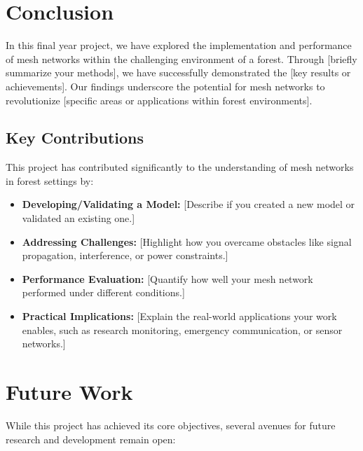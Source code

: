\section{Conclusion}
\label{ch:conclusion} %

In this final year project, we have explored the implementation and performance of mesh networks within the challenging environment of a forest. Through [briefly summarize your methods], we have successfully demonstrated the [key results or achievements]. Our findings underscore the potential for mesh networks to revolutionize [specific areas or applications within forest environments].

\subsection{Key Contributions}

This project has contributed significantly to the understanding of mesh networks in forest settings by:

\begin{itemize}
    \item \textbf{Developing/Validating a Model:} [Describe if you created a new model or validated an existing one.]
    \item \textbf{Addressing Challenges:} [Highlight how you overcame obstacles like signal propagation, interference, or power constraints.]
    \item \textbf{Performance Evaluation:} [Quantify how well your mesh network performed under different conditions.]
    \item \textbf{Practical Implications:} [Explain the real-world applications your work enables, such as research monitoring, emergency communication, or sensor networks.]
\end{itemize}

\section{Future Work}

While this project has achieved its core objectives, several avenues for future research and development remain open:

